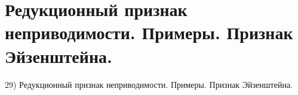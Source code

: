 \section{
 Редукционный признак неприводимости. Примеры. Признак Эйзенштейна.
}

29) Редукционный признак неприводимости. Примеры. Признак Эйзенштейна.
